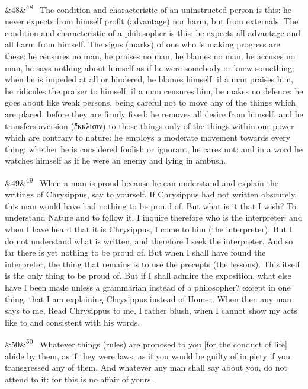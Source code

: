 \documentclass[12pt]{article}
\newcommand{\para}[1][]{\par\noindent\ifx&#1&\else\textsuperscript{\footnotesize #1}~\fi}
\begin{document}
\para[48] The condition and characteristic of an uninstructed person is this: he never expects from himself profit (advantage) nor harm, but from externals. The condition and characteristic of a philosopher is this: he expects all advantage and all harm from himself. The signs (marks) of one who is making progress are these: he censures no man, he praises no man, he blames no man, he accuses no man, he says nothing about himself as if he were somebody or knew something; when he is impeded at all or hindered, he blames himself: if a man praises him, he ridicules the praiser to himself: if a man censures him, he makes no defence: he goes about like weak persons, being careful not to move any of the things which are placed, before they are firmly fixed: he removes all desire from himself, and he transfers aversion (ἔκκλισιν) to those things only of the things within our power which are contrary to nature: he employs a moderate movement towards every thing: whether he is considered foolish or ignorant, he cares not: and in a word he watches himself as if he were an enemy and lying in ambush.

\para[49] When a man is proud because he can understand and explain the writings of Chrysippus, say to yourself, If Chrysippus had not written obscurely, this man would have had nothing to be proud of. But what is it that I wish? To understand Nature and to follow it. I inquire therefore who is the interpreter: and when I have heard that it is Chrysippus, I come to him (the interpreter). But I do not understand what is written, and therefore I seek the interpreter. And so far there is yet nothing to be proud of. But when I shall have found the interpreter, the thing that remains is to use the precepts (the lessons). This itself is the only thing to be proud of. But if I shall admire the exposition, what else have I been made unless a grammarian instead of a philosopher? except in one thing, that I am explaining Chrysippus instead of Homer. When then any man says to me, Read Chrysippus to me, I rather blush, when I cannot show my acts like to and consistent with his words.

\para[50] Whatever things (rules) are proposed to you [for the conduct of life] abide by them, as if they were laws, as if you would be guilty of impiety if you transgressed any of them. And whatever any man shall say about you, do not attend to it: for this is no affair of yours.
\end{document}
